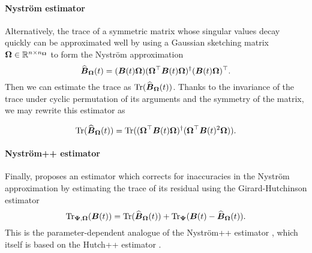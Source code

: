 \documentclass[12pt]{article}
\begin{document}
\paragraph{Nyström estimator} Alternatively, the trace of a symmetric matrix whose singular values decay quickly can be approximated well by using a Gaussian sketching matrix $\boldsymbol{\Omega} \in \mathbb{R}^{n \times n_{\boldsymbol{\Omega}}}$ to form the Nyström approximation \cite{gittens-2013-revisiting-nystrom}
\begin{equation}
    \widehat{\boldsymbol{B}}_{\boldsymbol{\Omega}}(t) = (\boldsymbol{B}(t) \boldsymbol{\Omega}) (\boldsymbol{\Omega}^{\top} \boldsymbol{B}(t) \boldsymbol{\Omega})^{\dagger} (\boldsymbol{B}(t) \boldsymbol{\Omega})^{\top}.
    \label{equ:nystrom-approximation}
\end{equation}
Then we can estimate the trace as $\operatorname{Tr}(\widehat{\boldsymbol{B}}_{\boldsymbol{\Omega}}(t))$. Thanks to the invariance of the trace under cyclic permutation of its arguments and the symmetry of the matrix, we may rewrite this estimator as

\begin{equation}
    \operatorname{Tr}(\widehat{\boldsymbol{B}}_{\boldsymbol{\Omega}}(t)) = \operatorname{Tr}( (\boldsymbol{\Omega}^{\top} \boldsymbol{B}(t) \boldsymbol{\Omega})^{\dagger} ( \boldsymbol{\Omega}^{\top} \boldsymbol{B}(t)^2 \boldsymbol{\Omega})).
    \label{equ:nystrom-trace-estimator}
\end{equation}

\paragraph{Nyström++ estimator} Finally, \cite{lin-2017-randomized-estimation} proposes an estimator which corrects for inaccuracies in the Nyström approximation  by estimating the trace of its residual using the Girard-Hutchinson estimator 
\begin{equation}
    \operatorname{Tr}_{\boldsymbol{\Psi}, \boldsymbol{\Omega}}(\boldsymbol{B}(t)) = \operatorname{Tr}(\widehat{\boldsymbol{B}}_{\boldsymbol{\Omega}}(t)) + \operatorname{Tr}_{\boldsymbol{\Psi}}(\boldsymbol{B}(t) - \widehat{\boldsymbol{B}}_{\boldsymbol{\Omega}}(t)).
    \label{equ:nystrompp-trace-estimator}
\end{equation}
This is the parameter-dependent analogue of the Nyström++ estimator \cite{persson-2022-improved-variants}, which itself is based on the Hutch++ estimator \cite{meyer-2021-hutch-optimal}. %
\end{document}
